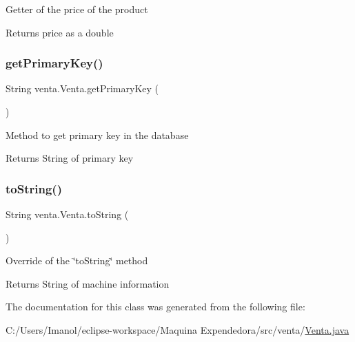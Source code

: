 Getter of the price of the product

\begin{DoxyReturn}{Returns}
price as a double 
\end{DoxyReturn}
\mbox{\label{classventa_1_1_venta_a7ae81f06ac0feabb86e70ae214f896f2}} 
\subsubsection{\texorpdfstring{get\+Primary\+Key()}{getPrimaryKey()}}
{\footnotesize\ttfamily String venta.\+Venta.\+get\+Primary\+Key (\begin{DoxyParamCaption}{ }\end{DoxyParamCaption})}

Method to get primary key in the database

\begin{DoxyReturn}{Returns}
String of primary key 
\end{DoxyReturn}
\mbox{\label{classventa_1_1_venta_afc2a44f382c68fb42c3a04f4e4890b29}} 
\subsubsection{\texorpdfstring{to\+String()}{toString()}}
{\footnotesize\ttfamily String venta.\+Venta.\+to\+String (\begin{DoxyParamCaption}{ }\end{DoxyParamCaption})}

Override of the \char`\"{}to\+String\char`\"{} method \begin{DoxyReturn}{Returns}
String of machine information 
\end{DoxyReturn}


The documentation for this class was generated from the following file\+:\begin{DoxyCompactItemize}
\item 
C\+:/\+Users/\+Imanol/eclipse-\/workspace/\+Maquina Expendedora/src/venta/\mbox{\hyperlink{_venta_8java}{Venta.\+java}}\end{DoxyCompactItemize}
